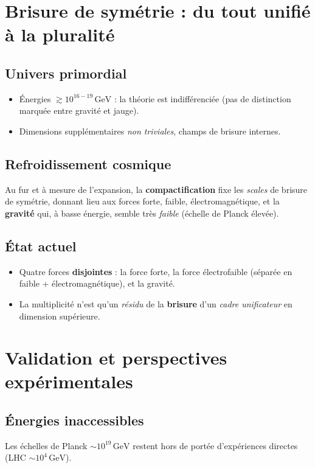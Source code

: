 \documentclass[12pt]{article}
\begin{document}
\section{Brisure de symétrie : du tout unifié à la pluralité}
\subsection{Univers primordial}
\begin{itemize}
\item Énergies $\gtrsim 10^{16\!-\!19}\,\mathrm{GeV}$ : 
      la théorie est \og indifférenciée \fg{} (pas de distinction marquée entre gravité et jauge).  
\item Dimensions supplémentaires \emph{non triviales}, champs de brisure internes.
\end{itemize}

\subsection{Refroidissement cosmique}
Au fur et à mesure de l'expansion, la \textbf{compactification} fixe les \emph{scales} 
de brisure de symétrie, donnant lieu aux forces forte, faible, électromagnétique, et 
la \textbf{gravité} qui, à basse énergie, semble très \emph{faible} (échelle de Planck élevée).

\subsection{État actuel}
\begin{itemize}
\item Quatre forces \textbf{disjointes} : 
      la force forte, la force électrofaible (séparée en faible + électromagnétique), et la gravité.  
\item La \og multiplicité\fg{} n'est qu'un \emph{résidu} de la \textbf{brisure} 
      d'un \emph{cadre unificateur} en dimension supérieure.
\end{itemize}

\section{Validation et perspectives expérimentales}

\subsection{Énergies inaccessibles}
Les échelles de Planck $\sim10^{19}\,\mathrm{GeV}$ 
restent hors de portée d'expériences directes (LHC $\sim10^{4}\,\mathrm{GeV}$).
\end{document}
